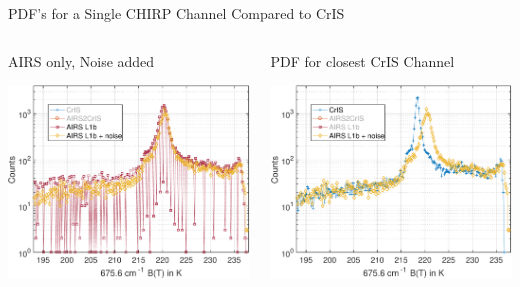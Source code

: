 \documentclass[10pt,t]{beamer}
\begin{document}
\begin{frame}[label={sec:org9631f7f}]{PDF's for a Single CHIRP Channel Compared to CrIS}
\vspace{-0.35in}
\begin{columns}
\begin{column}{0.55\columnwidth}
\begin{block}{\footnotesize AIRS only, Noise added}
\vspace{-0.05in}
\vspace{-0.05in}
\begin{center}
\includegraphics[width=0.77\linewidth]{./Figs/Pdf/jun4_2015_airs_675wn_global_counts_w_airsnoise.pdf}
\end{center}
\end{block}
\end{column}

\begin{column}{0.55\columnwidth}
\begin{block}{\footnotesize PDF for closest CrIS Channel}
\vspace{-0.05in}
\vspace{-0.05in}
\begin{center}
\includegraphics[width=0.77\linewidth]{./Figs/Pdf/jun4_2015_airs_675wn_global_counts_w_airsnoise_and_cris.pdf}
\end{center}
\end{block}
\end{column}
\end{columns}


\end{frame}
\end{document}
